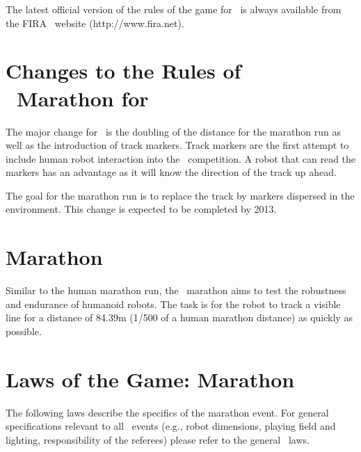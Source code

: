 \documentclass[12pt]{hurocup}
\begin{document}
The latest official version of the rules of the game for \HuroCup\ is
always available from the FIRA \HuroCup\ website (http://www.fira.net).

\section*{Changes to the Rules of \HuroCup\ Marathon for \thisyear}

The major change for \thisyear\ is the doubling of the distance for
the marathon run as well as the introduction of track markers. Track
markers are the first attempt to include human robot interaction into
the \HuroCup\ competition. A robot that can read the markers has an
advantage as it will know the direction of the track up ahead.

The goal for the marathon run is to replace the track by markers
dispersed in the environment. This change is expected to be completed
by 2013.

\newpage

\section{Marathon}
\label{sec:marathon} 

Similar to the human marathon run, the \HuroCup\ marathon aims to test
the robustness and endurance of humanoid robots. The task is for the
robot to track a visible line for a distance of 84.39m (1/500 of a
human marathon distance) as quickly as possible. 

\section{Laws of the Game: Marathon}
\label{sec:marathon-laws}

The following laws describe the specifics of the marathon
event. For general specifications relevant to all \HuroCup\ events
(e.g., robot dimensions, playing field and lighting, responsibility of
the referees) please refer to the general \HuroCup\ laws.

\label{mr-field}
\end{document}
